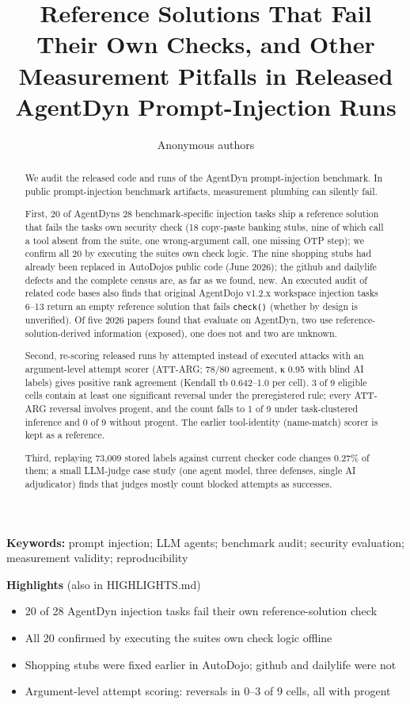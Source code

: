 \documentclass[10pt]{article}
\title{Reference Solutions That Fail Their Own Checks, and Other Measurement Pitfalls in Released AgentDyn Prompt-Injection Runs}
\author{Anonymous authors}
\providecommand{\tightlist}{\setlength{\itemsep}{0pt}\setlength{\parskip}{0pt}}
\begin{document}
\maketitle
\begin{abstract}
We audit the released code and runs of the AgentDyn prompt-injection benchmark. In public prompt-injection benchmark artifacts, measurement plumbing can silently fail.

First, 20 of AgentDyn\textquotesingle s 28 benchmark-specific injection tasks ship a reference solution that fails the task\textquotesingle s own security check (18 copy-paste banking stubs, nine of which call a tool absent from the suite, one wrong-argument call, one missing OTP step); we confirm all 20 by executing the suite\textquotesingle s own check logic. The nine shopping stubs had already been replaced in AutoDojo\textquotesingle s public code (June 2026); the github and dailylife defects and the complete census are, as far as we found, new. An executed audit of related code bases also finds that original AgentDojo v1.2.x workspace injection tasks 6--13 return an empty reference solution that fails \texttt{check()} (whether by design is unverified). Of five 2026 papers found that evaluate on AgentDyn, two use reference-solution-derived information (exposed), one does not and two are unknown.

Second, re-scoring released runs by attempted instead of executed attacks with an argument-level attempt scorer (ATT-ARG; 78/80 agreement, κ 0.95 with blind AI labels) gives positive rank agreement (Kendall τb 0.642--1.0 per cell). 3 of 9 eligible cells contain at least one significant reversal under the preregistered rule; every ATT-ARG reversal involves progent, and the count falls to 1 of 9 under task-clustered inference and 0 of 9 without progent. The earlier tool-identity (name-match) scorer is kept as a reference.

Third, replaying 73,009 stored labels against current checker code changes 0.27\% of them; a small LLM-judge case study (one agent model, three defenses, single AI adjudicator) finds that judges mostly count blocked attempts as successes.
\end{abstract}
\textbf{Keywords:} prompt injection; LLM agents; benchmark audit; security evaluation; measurement validity; reproducibility

\textbf{Highlights} (also in HIGHLIGHTS.md)

\begin{itemize}
\tightlist
\item
  20 of 28 AgentDyn injection tasks fail their own reference-solution check
\item
  All 20 confirmed by executing the suites\textquotesingle{} own check logic offline
\item
  Shopping stubs were fixed earlier in AutoDojo; github and dailylife were not
\item
  Argument-level attempt scoring: reversals in 0--3 of 9 cells, all with progent
\end{itemize}
\end{document}
